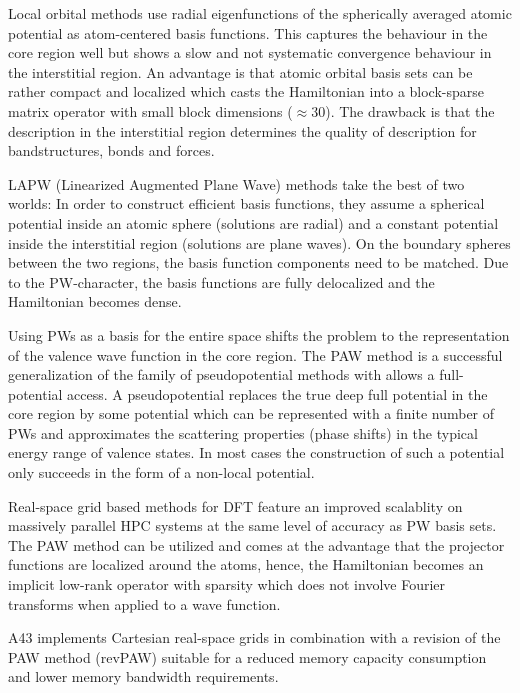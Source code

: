 \documentclass[oribibl]{llncs}
\newcommand{\codename}{A43}
\begin{document}
Local orbital methods use radial eigenfunctions 
of the spherically averaged atomic potential as atom-centered basis functions.
This captures the behaviour in the core region well
but shows a slow and not systematic convergence behaviour in the interstitial region. 
An advantage is that atomic orbital basis sets can be rather compact
and localized which casts the Hamiltonian into a block-sparse matrix operator with small block dimensions ($\approx 30$).
The drawback is that the description in the interstitial region determines the
quality of description for bandstructures, bonds and forces.

LAPW (Linearized Augmented Plane Wave) methods take the best of two worlds:
In order to construct efficient basis functions, 
they assume a spherical potential inside an atomic sphere (solutions are radial)
and a constant potential inside the interstitial region (solutions are plane waves). 
On the boundary spheres between the two regions, the basis function components need to be matched.
Due to the \ac{PW}-character, the basis functions are fully delocalized and 
the Hamiltonian becomes dense.

Using \ac{PW}s as a basis for the entire space shifts the problem to the representation of the valence wave function in the core region.
The \ac{PAW} method is a successful generalization of the family of pseudopotential methods with allows a full-potential access.
A pseudopotential replaces the true deep full potential in the core region
by some potential which can be represented with a finite number of \ac{PW}s
and approximates the scattering properties (phase shifts) in the typical energy
range of valence states.
In most cases the construction of such a potential only succeeds in the form of
a non-local potential.

Real-space grid based methods for \ac{DFT}
feature an improved scalablity on massively parallel \ac{HPC} systems at the same level of accuracy as \ac{PW} basis sets. 
The \ac{PAW} method can be utilized and comes at the advantage that the projector functions are localized around the atoms, 
hence, the Hamiltonian becomes an implicit low-rank operator with sparsity which does not involve Fourier transforms when applied to a wave function.


\codename{} implements Cartesian real-space grids 
in combination with a revision of the \ac{PAW} method (revPAW) suitable for
a reduced memory capacity consumption and lower memory bandwidth requirements.
\end{document}
